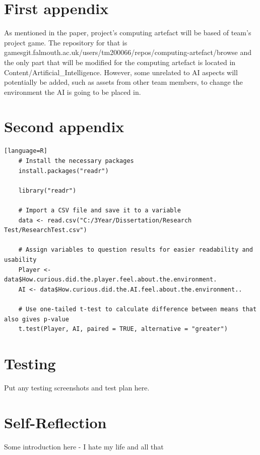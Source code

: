 \documentclass[journal]{IEEEtran}
\begin{document}





\appendices
\section{First appendix}
\label{appendix:a}
As mentioned in the paper, project's computing artefact will be based of team's project game. The repository for that is gamesgit.falmouth.ac.uk/users/tm200066/repos/computing-artefact/browse and the only part that will be modified for the computing artefact is located in Content/Artificial\_Intelligence. However, some unrelated to AI aspects will potentially be added, such as assets from other team members, to change the environment the AI is going to be placed in.

\newpage

\section{Second appendix}
\label{appendix:b}
\begin{lstlisting}[frame=single, breaklines=true][language=R]
	# Install the necessary packages
	install.packages("readr")

	library("readr")

	# Import a CSV file and save it to a variable
	data <- read.csv("C:/3Year/Dissertation/Research Test/ResearchTest.csv")

	# Assign variables to question results for easier readability and usability
	Player <- data$How.curious.did.the.player.feel.about.the.environment.
	AI <- data$How.curious.did.the.AI.feel.about.the.environment..

	# Use one-tailed t-test to calculate difference between means that also gives p-value
	t.test(Player, AI, paired = TRUE, alternative = "greater")
\end{lstlisting}

\section{Testing}
\label{appendix:testing}
Put any testing screenshots and test plan here.

\section{Self-Reflection}
Some introduction here - I hate my life and all that
\end{document}
